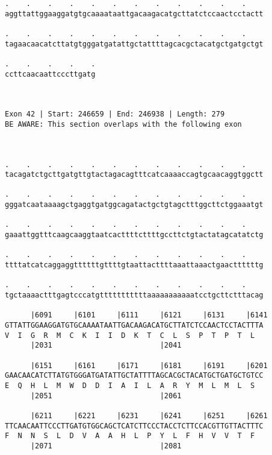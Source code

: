 \documentclass{article}
\begin{document}
\begin{Verbatim}
.    .    .    .    .    .    .    .    .    .    .    .    
aggttattggaaggatgtgcaaaataattgacaagacatgcttatctccaactcctactt
                                                            
.    .    .    .    .    .    .    .    .    .    .    .    
tagaacaacatcttatgtgggatgatattgctattttagcacgctacatgctgatgctgt
                                                            
.    .    .    .    .
ccttcaacaattcccttgatg
                     
                     
 
Exon 42 | Start: 246659 | End: 246938 | Length: 279
BE AWARE: This section overlaps with the following exon



.    .    .    .    .    .    .    .    .    .    .    .    
tacagatctgcttgatgttgtactagacagtttcatcaaaaccagtgcaacaggtggctt
                                                            
.    .    .    .    .    .    .    .    .    .    .    .    
gggatcaataaaagctgaggtgatggcagatactgctgtagctttggcttctggaaatgt
                                                            
.    .    .    .    .    .    .    .    .    .    .    .    
gaaattggtttcaagcaaggtaatcacttttcttttgccttctgtactatagcatatctg
                                                            
.    .    .    .    .    .    .    .    .    .    .    .    
ttttatcatcaggaggttttttgttttgtaattacttttaaattaaactgaacttttttg
                                                            
.    .    .    .    .    .    .    .    .    .    .    .    
tgctaaaactttgagtcccatgtttttttttttaaaaaaaaaaatcctgcttctttacag
                                                            
      |6091     |6101     |6111     |6121     |6131     |6141
GTTATTGGAAGGATGTGCAAAATAATTGACAAGACATGCTTATCTCCAACTCCTACTTTA
V  I  G  R  M  C  K  I  I  D  K  T  C  L  S  P  T  P  T  L  
      |2031                         |2041                   
  
      |6151     |6161     |6171     |6181     |6191     |6201
GAACAACATCTTATGTGGGATGATATTGCTATTTTAGCACGCTACATGCTGATGCTGTCC
E  Q  H  L  M  W  D  D  I  A  I  L  A  R  Y  M  L  M  L  S  
      |2051                         |2061                   
  
      |6211     |6221     |6231     |6241     |6251     |6261
TTCAACAATTCCCTTGATGTGGCAGCTCATCTTCCCTACCTCTTCCACGTTGTTACTTTC
F  N  N  S  L  D  V  A  A  H  L  P  Y  L  F  H  V  V  T  F  
      |2071                         |2081                   
  

\end{Verbatim}
\end{document}
